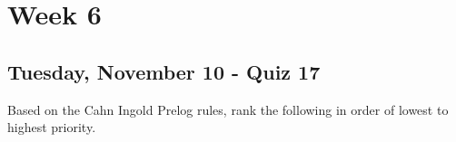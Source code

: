 \documentclass[12pt,a4paper]{article}
\begin{document}
\tableofcontents
\cleardoublepage
\fancyhead{}
\clearpage
\section*{Week 6}
{}

\subsection{Tuesday, November 10 - Quiz 17}
\begin{enumerate}
    {\color{G-Moon}\item Based on the Cahn Ingold Prelog rules, rank the following in order of lowest to highest priority.
    
}
\end{enumerate}
\end{document}
